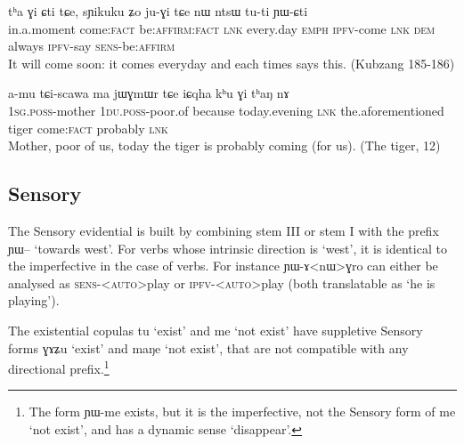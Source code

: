 \documentclass[oldfontcommands,oneside,a4paper,11pt]{article}
\newcommand{\ipa}[1]{{\phon \mbox{#1}}} %
\newcommand{\factual}[1]{\textsc{:fact}}
\begin{document}
\begin{exe}
\ex \label{ex:Gi.Cti}
\gll
 	\ipa{tʰa} 	\ipa{ɣi} 	\ipa{ɕti} 	\ipa{tɕe,} 	\ipa{sɲikuku} 	\ipa{ʑo} 	\ipa{ju-ɣi} 	\ipa{tɕe} 	\ipa{nɯ} 	\ipa{ntsɯ} 	\ipa{tu-ti} 	\ipa{ɲɯ-ɕti} 	\\
 in.a.moment come\factual{} be:\textsc{affirm}\factual{} \textsc{lnk} every.day \textsc{emph} \textsc{ipfv}-come \textsc{lnk} \textsc{dem} always \textsc{ipfv}-say \textsc{sens}-be:\textsc{affirm} \\
\glt It will come  soon: it comes everyday and each times says this. (Kubzang 185-186)
\end{exe}

\begin{exe}
\ex \label{ex:Gi.thaN}
\gll
 \ipa{a-mu} 	\ipa{tɕi-scawa} 	\ipa{ma} 	\ipa{jɯɣmɯr} 	\ipa{tɕe} 	\ipa{iɕqha} 	\ipa{kʰu} 	\ipa{ɣi} 	\ipa{tʰaŋ} 	\ipa{nɤ} 	\\
 \textsc{1sg.poss}-mother  \textsc{1du.poss}-poor.of because today.evening \textsc{lnk} the.aforementioned tiger  come\factual{} probably \textsc{lnk} \\
\glt Mother, poor of us, today the tiger is probably coming (for us). (The tiger, 12)
 \end{exe}

 

 
 \subsection{Sensory } \label{sec:sens}
The Sensory evidential is built by combining stem III or stem I with the prefix \ipa{ɲɯ--} `towards west'.  For verbs whose intrinsic direction is `west', it is identical to the imperfective in the case of verbs. For instance \ipa{ɲɯ-ɤ<nɯ>ɣro} can either be analysed as \textsc{sens-<auto>}play or \textsc{ipfv-<auto>}play (both translatable as `he is playing').


The existential copulas \ipa{tu} `exist' and \ipa{me} `not exist' have suppletive Sensory forms \ipa{ɣɤʑu} `exist'  and \ipa{maŋe} `not exist', that are not compatible with any directional prefix.\footnote{The form \ipa{ɲɯ-me} exists, but it is the imperfective, not the Sensory form of \ipa{me} `not exist', and has a dynamic sense `disappear'. }
\end{document}
